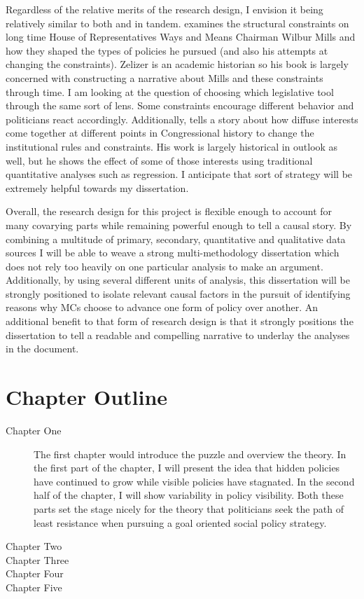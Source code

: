 \documentclass[12pt]{article}
\begin{document}
Regardless of the relative merits of the research design, I envision it being relatively similar to both \cite{zelizer1998} and \cite{schickler2001} in tandem. \cite{zelizer1998} examines the structural constraints on long time House of Representatives Ways and Means Chairman Wilbur Mills and how they shaped the types of policies he pursued (and also his attempts at changing the constraints). Zelizer is an academic historian so his book is largely concerned with constructing a narrative about Mills and these constraints through time. I am looking at the question of choosing which legislative tool through the same sort of lens. Some constraints encourage different behavior and politicians react accordingly. Additionally, \cite{schickler2001} tells a story about how diffuse interests come together at different points in Congressional history to change the institutional rules and constraints. His work is largely historical in outlook as well, but he shows the effect of some of those interests using traditional quantitative analyses such as regression. I anticipate that sort of strategy will be extremely helpful towards my dissertation.

Overall, the research design for this project is flexible enough to account for many covarying parts while remaining powerful enough to tell a causal story. By combining a multitude of primary, secondary, quantitative and qualitative data sources I will be able to weave a strong multi-methodology dissertation which does not rely too heavily on one particular analysis to make an argument. Additionally, by using several different units of analysis, this dissertation will be strongly positioned to isolate relevant causal factors in the pursuit of identifying reasons why MCs choose to advance one form of policy over another. An additional benefit to that form of research design is that it strongly positions the dissertation to tell a readable and compelling narrative to underlay the analyses in the document. 

\section{Chapter Outline}
\begin{description}
\item[Chapter One] The first chapter would introduce the puzzle and overview the theory. In the first part of the chapter, I will present the idea that hidden policies have continued to grow while visible policies have stagnated. In the second half of the chapter, I will show variability in policy visibility. Both these parts set the stage nicely for the theory that politicians seek the path of least resistance when pursuing a goal oriented social policy strategy.
\item[Chapter Two]
\item[Chapter Three]
\item[Chapter Four]
\item[Chapter Five]
\end{description}

\newpage
    {}


\end{document}
